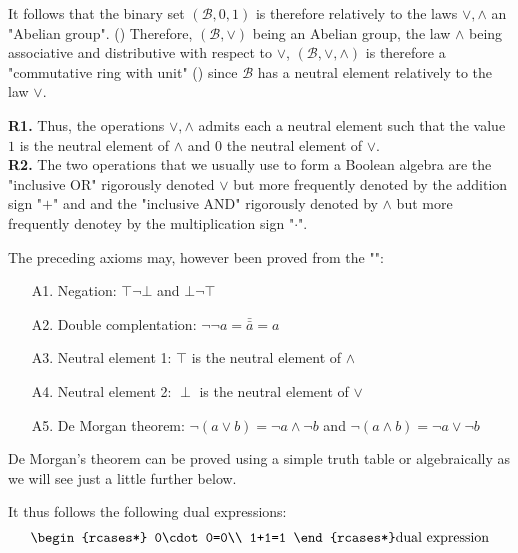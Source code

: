 	It follows that the binary set $(\mathcal{B},0,1)$ is therefore relatively to the laws $\vee,\wedge$ an "Abelian group". () Therefore, $(\mathcal{B},\vee)$ being an Abelian group, the law  $\wedge$  being associative and distributive with respect to $\vee$, $(\mathcal{B},\vee,\wedge)$ is therefore a "commutative ring with unit"  () since $\mathcal{B}$ has a neutral element relatively to the law $\vee$.
	\begin{tcolorbox}[title=Remarks,colframe=black,arc=10pt]
	\textbf{R1.} Thus, the operations $\vee,\wedge$ admits each a neutral element such that the value $1$ is the neutral element of $\wedge$ and $0$ the neutral element of $\vee$.\\
	
	\textbf{R2.} The two operations that we usually use to form a Boolean algebra are the "inclusive OR" rigorously denoted $\vee$ but more frequently denoted by the addition sign "$+$" and and the "inclusive AND" rigorously denoted by $\wedge$ but more frequently denotey by the multiplication sign "$\cdot$".
	\end{tcolorbox}
	
	The preceding axioms may, however been proved from the "":
	\begin{enumerate}
		\item[A1.] Negation: $\top\neg\bot$ and $\bot\neg \top$
		
		\item[A2.] Double complentation: $\neg\neg a=\bar{\bar{a}}=a$
		
		\item[A3.] Neutral element 1: $\top$ is the neutral element of $\wedge$
		\item[A4.] Neutral element 2: $\perp$ is the neutral element of $\vee$
		
		\item[A5.] De Morgan theorem: $\neg (a \vee b)=\neg a \wedge \neg b$ and $\neg (a\wedge b)=\neg a \vee \neg b$
	\end{enumerate}
	\begin{tcolorbox}[title=Remark,colframe=black,arc=10pt]
	De Morgan's theorem can be proved using a simple truth table or algebraically as we will see just a little further below.
	\end{tcolorbox}
	It thus follows the following dual expressions:
	\begin{gather*}
	\begin{rcases*}
	0\cdot 0=0\\
	1+1=1
	\end{rcases*} \text{dual expression}
	\end{gather*}
	
